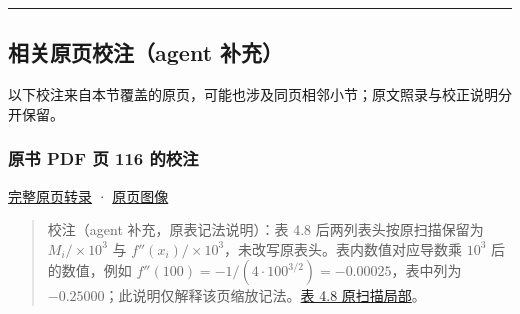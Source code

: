 \documentclass[
  10pt,
  fontset=fandol]{ctexart}
\begin{document}
\begin{center}\rule{0.5\linewidth}{0.5pt}\end{center}

\subsection{相关原页校注（agent 补充）}\label{ux76f8ux5173ux539fux9875ux6821ux6ce8agent-ux8865ux5145}

以下校注来自本节覆盖的原页，可能也涉及同页相邻小节；原文照录与校正说明分开保留。

\subsubsection{原书 PDF 页 116 的校注}\label{ux539fux4e66-pdf-ux9875-116-ux7684ux6821ux6ce8}

\href{../pages/pdf-116.md}{完整原页转录} · \href{../../source-images/pdf-116.jpeg}{原页图像}

\begin{quote}
校注（agent 补充，原表记法说明）：表 4.8 后两列表头按原扫描保留为 \(M_i/\times10^3\) 与 \(f''(x_i)/\times10^3\)，未改写原表头。表内数值对应导数乘 \(10^3\) 后的数值，例如 \(f''(100)=-1/(4\cdot100^{3/2})=-0.00025\)，表中列为 \(-0.25000\)；此说明仅解释该页缩放记法。\href{../assets/ch04b/review-table-4-8.png}{表 4.8 原扫描局部}。
\end{quote}
\end{document}
